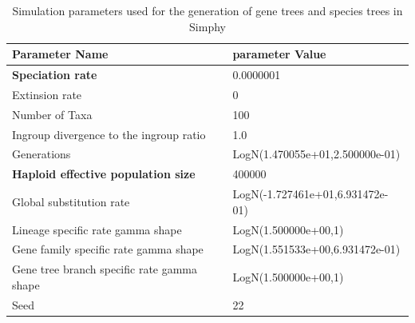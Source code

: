 \documentclass[10pt,a4paper]{article}
\begin{document}
\begin{table}[h!]
\centering

\begin{tabular}{|l|l|}
\hline
\textbf{Parameter Name} & \textbf{parameter Value} \\ \hline
\textbf{Speciation rate} & 0.0000001 \\ \hline
Extinsion rate & 0 \\ \hline
Number of Taxa & 100 \\ \hline
Ingroup divergence to the ingroup ratio & 1.0 \\ \hline
Generations & LogN(1.470055e+01,2.500000e-01) \\ \hline
\textbf{Haploid effective population size} & 400000 \\ \hline
Global substitution rate & LogN(-1.727461e+01,6.931472e-01) \\ \hline
Lineage specific rate gamma shape & LogN(1.500000e+00,1) \\ \hline
Gene family specific rate gamma shape & LogN(1.551533e+00,6.931472e-01) \\ \hline
Gene tree branch specific rate gamma shape & LogN(1.500000e+00,1) \\ \hline
Seed & 22 \\ \hline
\end{tabular}
\vspace{6pt}
\caption{Simulation parameters used for the generation of gene trees and species trees in Simphy}
\label{tab:simphy-params}

\end{table}



% 

\end{document}

